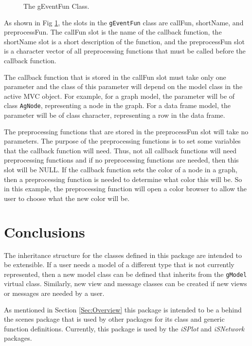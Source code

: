 \documentclass[11pt]{article}
\newcommand{\Robject}[1]{{\texttt{#1}}}
\newcommand{\Rpackage}[1]{{\textit{#1}}}
\begin{document}
\begin{figure}[ht]
  \begin{center}
    \caption{ The gEventFun Class. }
    \label{Fig:EventFun}
  \end{center}
\end{figure}

As shown in Fig \ref{Fig:EventFun}, the slots in the \Robject{gEventFun} class
are callFun, shortName, and preprocessFun.  The callFun slot is the name of
the callback function, the shortName slot is a short description of the
function, and the preprocessFun slot is a character vector of all
preprocessing functions that must be called before the callback function.

The callback function that is stored in the callFun slot must take only one
parameter and the class of this parameter will depend on the model class in
the active MVC object.  For example, for a graph model, the
parameter will be of class \Robject{AgNode}, representing a node in the graph.
For a data frame model, the parameter will be of class character, representing
a row in the data frame.

The preprocessing functions that are stored in the preprocessFun slot will
take no parameters.  The purpose of the preprocessing functions is to set some
variables that the callback function will need.  Thus, not all callback
functions will need preprocessing functions and if no preprocessing functions
are needed, then this slot will be NULL.  If the callback function sets the
color of a node in a graph, then a preprocessing function is needed to
determine what color this will be.  So in this example, the preprocessing
function will open a color browser to allow the user to choose what the new
color will be.

\section{Conclusions}\label{Sec:Conc}

The inheritance structure for the classes defined in this package are intended 
to be extensible.  If a user needs a model of a different type that is not 
currently represented, then a new model class can be defined that inherits 
from the \Robject{gModel} virtual class.  Similarly, new view and message 
classes can be created if new views or messages are needed by a user.

As mentioned in Section \ref{Sec:Overview} this package is intended to be a 
behind the scenes package that is used by other packages for its class and 
generic function definitions.  Currently, this package is used by the 
\Rpackage{iSPlot} and \Rpackage{iSNetwork} packages.
\end{document}
